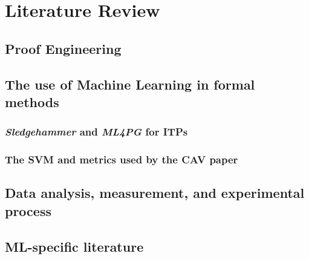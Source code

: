 \chapter{Literature Review}%

\label{LitReview} %


\section{Proof Engineering}
\section{The use of Machine Learning in formal methods}
\subsection{\textit{Sledgehammer} and \textit{ML4PG} for \textsc{ITP}s}
\subsection{The \textsc{SVM} and metrics used by the \textsc{CAV} paper}
\section{Data analysis, measurement, and experimental process}
\section{ML-specific literature}